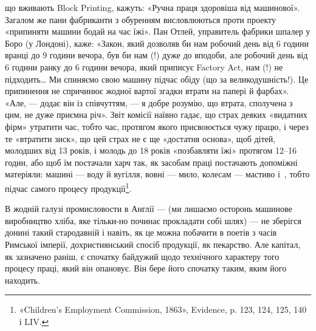 що вживають Block Printing, кажуть: «Ручна праця
здоровіша від машинової». Загалом же пани фабриканти з обуренням
висловлюються проти проекту «припиняти машини бодай
на час їжі». Пан Отлей, управитель фабрики шпалер у Боро
(у Лондоні), каже: «Закон, який дозволяв би нам робочий день
від 6 години вранці до 9 години вечора, був би нам (!) дуже до вподоби,
але робочий день від 6 години ранку до 6 години вечора,
який приписує Factory Act, нам (!) не підходить\dots{} Ми спиняємо
свою машину підчас обіду (що за великодушність!). Це припинення
не спричинює жодної вартої згадки втрати на папері й фарбах».
«Але, — додає він із співчуттям, — я добре розумію, що втрата,
сполучена з цим, не дуже приємна річ». Звіт комісії наївно гадає,
що страх деяких «видатних фірм» утратити час, тобто час, протягом
якого присвоюється чужу працю, і через те «втратити зиск»,
що цей страх не є ще «достатня основа», щоб дітей, молодших
від 13 років, і молодь до 18 років «позбавляти їжі» протягом
12--16 годин, або щоб їм постачали харч так, як засобам праці
постачають допоміжні матеріяли: машині — воду й вугілля,
вовні — мило, колесам — мастиво і~, тобто підчас самого
процесу продукції\footnote{
«Children’s Employment Commission, 1863», Evidence, p. 123,
124, 125, 140 і LIV.
}.

В жодній галузі промисловости в Англії — (ми лишаємо осторонь
машинове виробництво хліба, яке тільки-но починає прокладати
собі шлях) — не зберігся донині такий стародавній
і навіть, як це можна побачити в поетів з часів Римської імперії,
дохристиянський спосіб продукції, як пекарство. Але капітал,
як зазначено раніш, є спочатку байдужий щодо технічного характеру
того процесу праці, який він опановує. Він бере його
спочатку таким, яким його находить.

